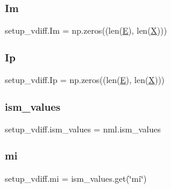 \mbox{\label{namespacesetup__vdiff_a4c4cb9a325cda7540005e48116ea877d}} 
\subsubsection{\texorpdfstring{Im}{Im}}
{\footnotesize\ttfamily setup\+\_\+vdiff.\+Im = np.\+zeros((len(\hyperlink{namespacesetup__vdiff_a7780682c76ff3896106f4045b64e582a}{E}), len(\hyperlink{namespacesetup__vdiff_a2d0381db5d912bb072d7cfa7c997de97}{X})))}

\mbox{\label{namespacesetup__vdiff_a7a8cdb88199d60d403199fffa1acda80}} 
\subsubsection{\texorpdfstring{Ip}{Ip}}
{\footnotesize\ttfamily setup\+\_\+vdiff.\+Ip = np.\+zeros((len(\hyperlink{namespacesetup__vdiff_a7780682c76ff3896106f4045b64e582a}{E}), len(\hyperlink{namespacesetup__vdiff_a2d0381db5d912bb072d7cfa7c997de97}{X})))}

\mbox{\label{namespacesetup__vdiff_aa35267b78597abc4269ab0277b941893}} 
\subsubsection{\texorpdfstring{ism\+\_\+values}{ism\_values}}
{\footnotesize\ttfamily setup\+\_\+vdiff.\+ism\+\_\+values = nml.\+ism\+\_\+values}

\mbox{\label{namespacesetup__vdiff_a6df39d82007581d5bf7c12efe1a6ad30}} 
\subsubsection{\texorpdfstring{mi}{mi}}
{\footnotesize\ttfamily setup\+\_\+vdiff.\+mi = ism\+\_\+values.\+get(\char`\"{}mi\char`\"{})}

